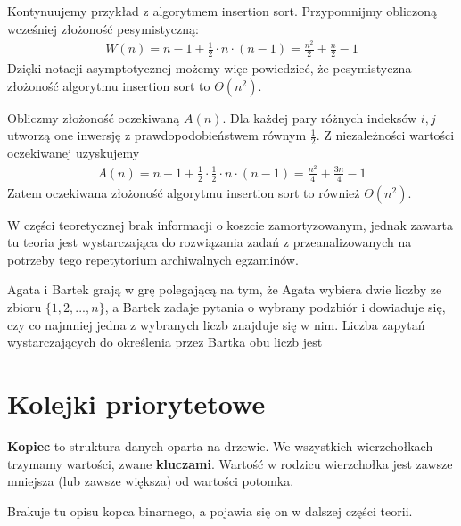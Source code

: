\begin{example}
    Kontynuujemy przykład z algorytmem insertion sort. Przypomnijmy obliczoną wcześniej złożoność pesymistyczną:
    \begin{align*}
        W(n) = n - 1 + \frac{1}{2} \cdot n \cdot (n-1) = \frac{n^2}{2} + \frac{n}{2} - 1 
    \end{align*}
    Dzięki notacji asymptotycznej możemy więc powiedzieć, że pesymistyczna złożoność algorytmu insertion sort to $\Theta(n^2)$.

    Obliczmy złożoność oczekiwaną $A(n)$. Dla każdej pary różnych indeksów $i, j$ utworzą one inwersję z prawdopodobieństwem równym $\frac{1}{2}$. Z niezależności wartości oczekiwanej uzyskujemy
    \begin{align*}
        A(n) = n - 1 + \frac{1}{2} \cdot \frac{1}{2} \cdot n \cdot (n-1) = \frac{n^2}{4} + \frac{3n}{4} - 1
    \end{align*}
    Zatem oczekiwana złożoność algorytmu insertion sort to również $\Theta(n^2)$.
\end{example}

\begin{editorsnote}
    W części teoretycznej brak informacji o koszcie zamortyzowanym, jednak zawarta tu teoria jest wystarczająca do rozwiązania zadań z przeanalizowanych na potrzeby tego repetytorium archiwalnych egzaminów.
\end{editorsnote}

\begin{problems}
    \prob Agata i Bartek grają w grę polegającą na tym, że Agata wybiera dwie liczby ze zbioru $\{1, 2, ..., n\}$, a Bartek zadaje pytania o wybrany podzbiór i dowiaduje się, czy co najmniej jedna z wybranych liczb znajduje się w nim. Liczba zapytań wystarczających do określenia przez Bartka obu liczb jest
\end{problems}

\section{Kolejki priorytetowe}

\textbf{Kopiec} to struktura danych oparta na drzewie. We wszystkich wierzchołkach trzymamy wartości, zwane \textbf{kluczami}.
Wartość w rodzicu wierzchołka jest zawsze mniejsza (lub zawsze większa) od wartości potomka.

\begin{editorsnote}
    Brakuje tu opisu kopca binarnego, a pojawia się on w dalszej części teorii.
\end{editorsnote}

